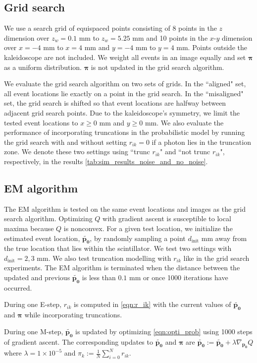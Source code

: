 \subsection{Grid search}
We use a search grid of equispaced points consisting of 8 points in the 
$z$ dimension over $z_w=0.1$ mm to $z_w=5.25$ mm and 10 points in the $x$-$y$ 
dimension over $x=-4$ mm to $x=4$ mm and $y=-4$ mm to $y=4$ mm.
Points outside the kaleidoscope are not included.
We weight all events in an image equally and set $\bm{\pi}$ as a uniform 
distribution. $\bm{\pi}$ is not updated in the grid search algorithm.

We evaluate the grid search algorithm on two sets of grids.
In the ``aligned" set, all event locations lie exactly on a point in the grid search.
In the ``misaligned" set, the grid search is shifted so that event locations are  
halfway between adjacent grid search points.
Due to the kaleidoscope's symmetry, we limit the tested event locations to 
$x\geq0$ mm and $y\geq0$ mm.
We also evaluate the performance of incorporating truncations in the 
probabilistic model by running the grid search with and without setting 
$r_{ik}=0$ if a photon lies in the truncation zone.
We denote these two settings using ``trunc $r_{ik}$" and ``not trunc $r_{ik}$", 
respectively, in the results \cref{tab:sim_results_noise_and_no_noise}.


\subsection{EM algorithm}

The EM algorithm is tested on the same event locations and images as the grid 
search algorithm.
Optimizing $Q$ with gradient ascent is susceptible to local maxima because $Q$ 
is nonconvex.
For a given test location, we initialize the estimated event location,
$\bm{\tilde{p_0}}$, by randomly sampling a point $d_\text{init}$ mm away from the 
true location that lies within the scintillator.
We test two settings with $d_\text{init}=2,3$ mm.
We also test truncation modelling with $r_{ik}$ like in the grid search experiments.
The EM algorithm is terminated when the distance between the updated and 
previous $\bm{\tilde{p_0}}$ is less than $0.1$ mm or once 1000 iterations have occurred.

During one E-step, $r_{ik}$ is computed in \cref{eqn:r_ik} with the current 
values of $\bm{\tilde{p_0}}$ and $\bm{\pi}$ while incorporating truncations.

During one M-step, $\bm{\tilde{p_0}}$ is updated by optimizing 
\cref{eqn:opti_prob} using 1000 steps of gradient ascent.
The corresponding updates to $\bm{\tilde{p_0}}$ and $\bm{\pi}$ are
$\bm{\tilde{p_0}} := \bm{\tilde{p_0}} + \lambda \nabla_{\bm{p_0}} Q$ 
where $\lambda=1 \times 10^{-5}$
and $\pi_k := \frac{1}{N} \sum_{i=0}^N r_{ik}$.


